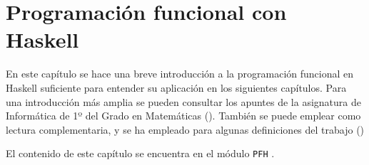 \chapter{Programación funcional con Haskell}

En este capítulo se hace una breve introducción a la programación funcional en
Haskell suficiente para entender su aplicación en los siguientes
capítulos. Para una introducción más amplia se pueden consultar los apuntes de
la asignatura de Informática de 1º del Grado en Matemáticas
(\cite{Alonso-15b}). También se puede emplear como lectura complementaria,
y se ha empleado para algunas definiciones del trabajo (\cite{YerPal-90})

El contenido de este capítulo se encuentra en el módulo \texttt{PFH} 
.
